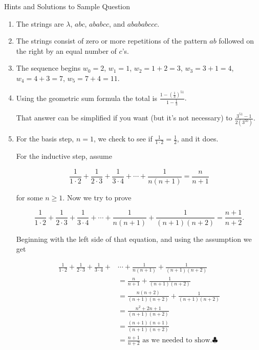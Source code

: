 \documentclass[11pt]{amsart}
\begin{document}
\vskip 30pt

\centerline{Hints and Solutions to Sample Question}

\medskip

\begin{enumerate}

 
\item The strings are $\lambda$, $abc$, $ababcc$, and $abababccc$.

\medskip

\item The strings consist of zero or more repetitions of the pattern $ab$ followed on the
right by an equal number of $c$'s.

\medskip

\item The sequence begins $w_0=2$, $w_1=1$, $w_2 =1+2 = 3$, $w_3 = 3+1 = 4$,
$w_4 = 4+3 = 7$, $w_5 = 7+4 = 11$. 

\medskip

\item Using the geometric sum formula the total is 
$\displaystyle \frac{1- \left(\frac{1}{3}\right)^{51}}{1-\frac{1}{3}}.$

That answer can be simplified if you want (but it's not necessary) to 
$\displaystyle \frac{3^{51}-1}{2(3^{50})}$.
\medskip

\item For the basis step, $n=1$, we check to see if $\displaystyle \frac{1}{1\cdot2}= \frac{1}{2}$, and it does.

For the inductive step, assume 

\[
\frac{1}{1\cdot2}+\frac{1}{2\cdot3}+\frac{1}{3\cdot4}+\cdots+\frac{1}{n(n+1)}= \frac{n}{n+1}
\]

for some $n\geq 1$. Now we try to prove

\[
\frac{1}{1\cdot2}+\frac{1}{2\cdot3}+\frac{1}{3\cdot4}+\cdots+\frac{1}{n(n+1)} +\frac{1}{(n+1)(n+2)}
= \frac{n+1}{n+2}.
\]

Beginning with the left side of that equation, and using the assumption we get

\begin{align*}
\frac{1}{1\cdot2}+\frac{1}{2\cdot3}+\frac{1}{3\cdot4}+&\cdots+\frac{1}{n(n+1)} +\frac{1}{(n+1)(n+2)}\\[5pt]
& = \frac{n}{n+1}+ \frac{1}{(n+1)(n+2)}\\[5pt]
&=  \frac{n(n+2)}{(n+1)(n+2)}+ \frac{1}{(n+1)(n+2)}\\[5pt]
&= \frac{n^2+2n+1}{(n+1)(n+2)}\\[5pt]
&= \frac{(n+1)(n+1)}{(n+1)(n+2)}\\[5pt]
&= \frac{n+1}{n+2} \text{ as we needed to show.}  \clubsuit\\[5pt]
\end{align*}



\end{enumerate}
\end{document}
